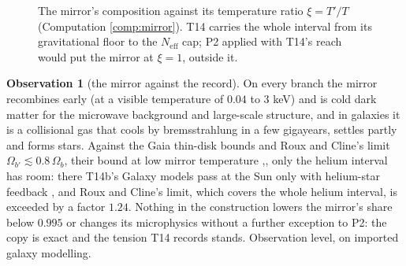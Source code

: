 \documentclass[11pt]{article}
\theoremstyle{definition}
\newtheorem{observation}[theorem]{Observation}
\newcommand{\Neff}{N_{\mathrm{eff}}}
\begin{document}
\begin{figure}[ht]
\centering
{}
\caption{The mirror's composition against its temperature ratio $\xi = T'/T$ (Computation \ref{comp:mirror}). T14 carries the whole interval from its gravitational floor to the $\Neff$ cap; P2 applied with T14's reach would put the mirror at $\xi = 1$, outside it.}
\label{fig:mirror}
\end{figure}

\begin{observation}[the mirror against the record]\label{obs:mirror}
On every branch the mirror recombines early (at a visible temperature of $0.04$ to $3$ keV) and is cold dark matter for the microwave background and large-scale structure, and in galaxies it is a collisional gas that cools by bremsstrahlung in a few gigayears, settles partly and forms stars. Against the Gaia thin-disk bounds \cite{Widmark2021} and Roux and Cline's limit $\Omega_{b'} \lesssim 0.8\,\Omega_{b}$, their bound at low mirror temperature \cite{RouxCline2020},, only the helium interval has room: there T14b's Galaxy models pass at the Sun only with helium-star feedback \cite[Obs.~9.1]{ButlerT14b}, and Roux and Cline's limit, which covers the whole helium interval, is exceeded by a factor $1.24$. Nothing in the construction lowers the mirror's share below $0.995$ or changes its microphysics without a further exception to P2: the copy is exact and the tension T14 records stands. Observation level, on imported galaxy modelling.
\end{observation}
\end{document}
